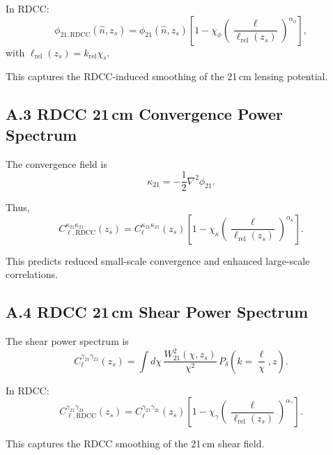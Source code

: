 \documentclass[11pt,a4paper]{article}
\begin{document}
In RDCC:
\begin{equation}
\phi_{21,\mathrm{RDCC}}(\hat{n},z_{s})
=
\phi_{21}(\hat{n},z_{s})
\left[
1
-
\chi_{\phi}
\left(
\frac{\ell}{\ell_{\mathrm{rel}}(z_{s})}
\right)^{\alpha_{\phi}}
\right],
\end{equation}
with $\ell_{\mathrm{rel}}(z_{s}) = k_{\mathrm{rel}}\chi_{s}$.

This captures the RDCC-induced smoothing of the 21\,cm lensing potential.

\subsection*{A.3 RDCC 21\,cm Convergence Power Spectrum}

The convergence field is
\begin{equation}
\kappa_{21}
=
-\frac{1}{2}\nabla^{2}\phi_{21}.
\end{equation}

Thus,
\begin{equation}
C_{\ell,\mathrm{RDCC}}^{\kappa_{21}\kappa_{21}}(z_{s})
=
C_{\ell}^{\kappa_{21}\kappa_{21}}(z_{s})
\left[
1
-
\chi_{\kappa}
\left(
\frac{\ell}{\ell_{\mathrm{rel}}(z_{s})}
\right)^{\alpha_{\kappa}}
\right].
\end{equation}

This predicts reduced small-scale convergence and enhanced large-scale correlations.

\subsection*{A.4 RDCC 21\,cm Shear Power Spectrum}

The shear power spectrum is
\begin{equation}
C_{\ell}^{\gamma_{21}\gamma_{21}}(z_{s})
=
\int d\chi\,
\frac{W_{21}^{2}(\chi,z_{s})}{\chi^{2}}\,
P_{\delta}\!\left(k=\frac{\ell}{\chi},z\right).
\end{equation}

In RDCC:
\begin{equation}
C_{\ell,\mathrm{RDCC}}^{\gamma_{21}\gamma_{21}}(z_{s})
=
C_{\ell}^{\gamma_{21}\gamma_{21}}(z_{s})
\left[
1
-
\chi_{\gamma}
\left(
\frac{\ell}{\ell_{\mathrm{rel}}(z_{s})}
\right)^{\alpha_{\gamma}}
\right].
\end{equation}

This captures the RDCC smoothing of the 21\,cm shear field.
\end{document}
